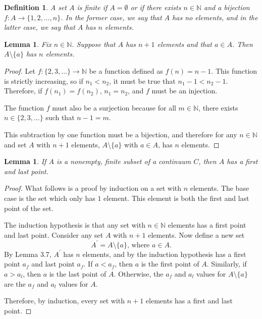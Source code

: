 \documentclass{amsart}
\newtheorem{lemma}[theorem]{Lemma}
\newtheorem{definition}[theorem]{Definition}
\newcommand{\N}{\mathbb N}
\newcommand{\1}{\mathds{1}}
\def \N {{\mathbb {N}}}
\numberwithin{equation}{section}
\numberwithin{theorem}{section}
\begin{document}
\begin{definition}
	A set $A$ is finite if $A= \emptyset$ or if there exists $n\in\N$ and a bijection $f: A \to \{1,2,\dots, n\}$.  In the former case, we say that $A$ has no elements, and in the latter case, we say that $A$ has $n$ elements.
\end{definition}

\begin{lemma}
	Fix $n\in \N$.  Suppose that $A$ has $n+1$ elements and that $a\in A$.  Then $A\setminus\{a\}$ has $n$ elements.
\end{lemma}

\begin{proof}
	
	Let $f:\{2,3,\dots\}\to\N$ be a function defined as $f(n)=n-1$. This function is strictly increasing, so if $n_1<n_2$, it must be true that $n_1-1<n_2-1$. Therefore, if $f(n_1)=f(n_2)$, $n_1=n_2$, and $f$ must be an injection. 
	
	The function $f$ must also be a surjection because for all $m\in\N$, there exists $n\in\{2,3,\dots\}$ such that $n-1=m$. 
	
	This subtraction by one function must be a bijection, and therefore for any $n\in\N$ and set $A$ with $n+1$ elements, $A\setminus\{a\}$ with $a\in A$, has $n$ elements.
\end{proof}

\begin{lemma}  If $A$ is a nonempty, finite subset of a continuum $C$, then $A$ has a first and last point.
\end{lemma}

\begin{proof}
	What follows is a proof by induction on a set with $n$ elements. The base case is the set which only has $1$ element. This element is both the first and last point of the set. 
	
	The induction hypothesis is that any set with $n\in\N$ elements has a first point and last point. Consider any set $A$ with $n+1$ elements. Now define a new set $$A^\prime=A\setminus\{a\}\text{, where } a\in A.$$ By Lemma 3.7, $A^\prime$ has $n$ elements, and by the induction hypothesis has a first point $a_f$ and last point $a_f$. If $a< a_f$, then $a$ is the first point of $A$. Similarly, if $a> a_l$, then $a$ is the last point of $A$. Otherwise, the $a_f$ and $a_l$ values for $A\setminus \{a\}$ are the $a_f$ and $a_l$ values for $A$. 
	
	Therefore, by induction, every set with $n+1$ elements has a first and last point.
\end{proof}
\end{document}
